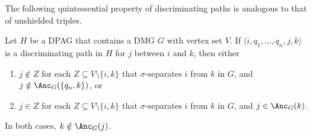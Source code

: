 The following quintessential property of discriminating paths is analogous to that of unshielded triples. 
\begin{Prp}\label{prp:orienting_discriminating_paths}
Let $H$ be a DPAG that contains a DMG $G$ with vertex set $V$.
  If $\langle i, q_1, \dots, q_n, j, k \rangle$ is a discriminating path in $H$ for $j$ between $i$ and $k$, then
  either 
  \begin{enumerate}[label=(\roman*)]
    \item $j \notin Z$ for each $Z \subseteq V \setminus \{i,k\}$ that $\sigma$-separates $i$ from $k$ in $G$, and $j \notin \Anc_G(\{q_n,k\})$, or
    \item $j \in Z$ for each $Z \subseteq V \setminus \{i,k\}$ that $\sigma$-separates $i$ from $k$ in $G$, and $j \in \Anc_G(k)$.
  \end{enumerate}
  In both cases, $k \notin \Anc_G(j)$.
\end{Prp}
